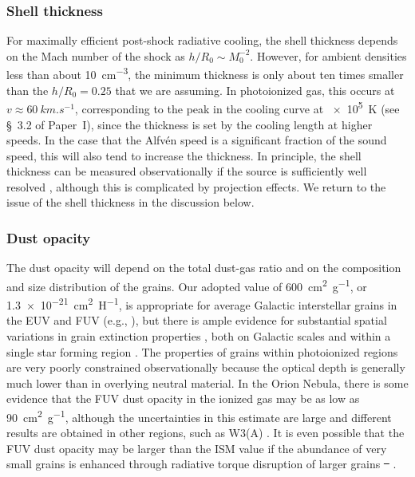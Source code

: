 \documentclass[useAMS, usenatbib, a4paper]{mnras}
\providecommand{\DIFaddtex}[1]{{\protect\color{red!70!black}\uwave{#1}}} %
\providecommand{\DIFdeltex}[1]{{\protect\color{white!50!black} \ifmmode\cancel{#1}\else\sout{#1}\fi}} %
\providecommand{\DIFaddbegin}{} %
\providecommand{\DIFaddend}{} %
\providecommand{\DIFdelbegin}{} %
\providecommand{\DIFdelend}{} %
\providecommand{\DIFadd}[1]{\texorpdfstring{\DIFaddtex{#1}}{#1}} %
\providecommand{\DIFdel}[1]{\texorpdfstring{\DIFdeltex{#1}}{}} %
\begin{document}
\subsubsection{Shell thickness}
\label{sec:shell-thickness}
For maximally efficient post-shock radiative cooling, the shell
thickness depends on the Mach number of the shock as
\(h / R_0 \sim M_0^{-2}\).  However, for ambient densities less than
about \SI{10}{cm^{-3}}, the minimum thickness is only about ten times
smaller than the \(h / R_0 = 0.25\) that we are assuming.  In
photoionized gas, this occurs at \(v \approx \SI{60}{km.s^{-1}}\),
corresponding to the peak in the cooling curve at \SI{e5}{K} (see
\S~3.2 of Paper~I),
since the thickness is set by the cooling length at higher speeds.  In
the case that the Alfv\'en speed is a significant fraction of the
sound speed, this will also tend to increase the thickness.  In
principle, the shell thickness can be measured observationally if the
source is sufficiently well resolved \citep{Kobulnicky:2017a},
although this is complicated by projection effects.  We return to the
issue of the shell thickness in the discussion below.

\subsubsection{Dust opacity}
\label{sec:dust-opacity}
The dust opacity will depend on the total dust-gas ratio and on the
composition and size distribution of the grains.  Our adopted value of
\SI{600}{cm^2.g^{-1}}, or \SI{1.3e-21}{cm^2.H^{-1}}, is appropriate
for average Galactic interstellar grains in the EUV and FUV (e.g.,
\citealp{Weingartner:2001a}), but there is ample evidence for
substantial spatial variations in grain extinction properties
\citep{Fitzpatrick:2007a}, both on Galactic scales
\citep{Schlafly:2016a} and within a single star forming region
\citep{Beitia-Antero:2017a}.  The properties of grains within
photoionized regions are very poorly constrained observationally
because the optical depth is generally much lower than in overlying
neutral material.  In the Orion Nebula, there is some evidence
\citep{Salgado:2016a} that the FUV dust opacity in the ionized gas may
be as low as \SI{90}{cm^2.g^{-1}}, although the uncertainties in this
estimate are large and different results are obtained in other
regions, such as W3(A) \citep{Salgado:2012a}.  It is even possible
that the FUV dust opacity may be larger than the ISM value if the
abundance of very small grains is enhanced through radiative torque
disruption of larger grains \DIFdelbegin \DIFdel{\mbox{%
\citep{Hoang:2018a}}%
}\DIFdelend \DIFaddbegin \DIFadd{\mbox{%
\citep{Hoang:2019b}}%
}\DIFaddend .
\end{document}
